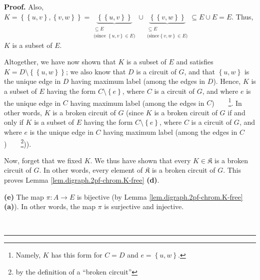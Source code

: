 \documentclass[numbers=enddot,12pt,final,onecolumn,notitlepage]{scrartcl}%
\theoremstyle{definition}
\newenvironment{proof}[1][Proof]{\noindent\textbf{#1.} }{\ \rule{0.5em}{0.5em}}
\newenvironment{verlong}{}{}
\begin{document}
\begin{verlong}
\begin{proof}
Also, $K=\left\{  \left\{  u,v\right\}  ,\left\{  v,w\right\}  \right\}
=\underbrace{\left\{  \left\{  u,v\right\}  \right\}  }_{\substack{\subseteq
E\\\text{(since }\left\{  u,v\right\}  \in E\text{)}}}\cup\underbrace{\left\{
\left\{  v,w\right\}  \right\}  }_{\substack{\subseteq E\\\text{(since
}\left\{  v,w\right\}  \in E\text{)}}}\subseteq E\cup E=E$. Thus, $K$ is a
subset of $E$.

Altogether, we have now shown that $K$ is a subset of $E$ and satisfies
$K=D\setminus\left\{  \left\{  u,w\right\}  \right\}  $; we also know that $D$
is a circuit of $G$, and that $\left\{  u,w\right\}  $ is the unique edge in
$D$ having maximum label (among the edges in $D$). Hence, $K$ is a subset of
$E$ having the form $C\setminus\left\{  e\right\}  $, where $C$ is a circuit
of $G$, and where $e$ is the unique edge in $C$ having maximum label (among
the edges in $C$)\ \ \ \ \footnote{Namely, $K$ has this form for $C=D$ and
$e=\left\{  u,w\right\}  $.}. In other words, $K$ is a broken circuit of $G$
(since $K$ is a broken circuit of $G$ if and only if $K$ is a subset of $E$
having the form $C\setminus\left\{  e\right\}  $, where $C$ is a circuit of
$G$, and where $e$ is the unique edge in $C$ having maximum label (among the
edges in $C$)\ \ \ \ \footnote{by the definition of a \textquotedblleft broken
circuit\textquotedblright})).

Now, forget that we fixed $K$. We thus have shown that every $K\in
\mathfrak{K}$ is a broken circuit of $G$. In other words, every element of
$\mathfrak{K}$ is a broken circuit of $G$. This proves Lemma
\ref{lem.digraph.2pf-chrom.K-free} \textbf{(d)}.

\textbf{(e)} The map $\pi:A\rightarrow E$ is bijective (by Lemma
\ref{lem.digraph.2pf-chrom.K-free} \textbf{(a)}). In other words, the map
$\pi$ is surjective and injective.


\end{proof}
\end{verlong}
\end{document}
